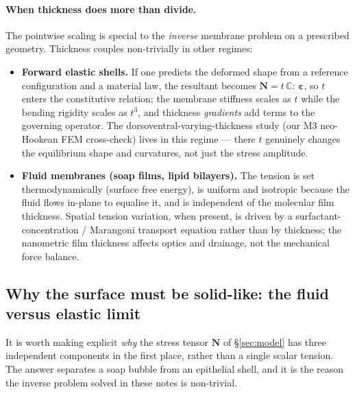 \documentclass[11pt]{article}
\newcommand{\Nb}{\mathbf{N}}           %
\begin{document}
\paragraph{When thickness does more than divide.}
The pointwise scaling is special to the \emph{inverse} membrane problem on a
prescribed geometry.  Thickness couples non-trivially in other regimes:
\begin{itemize}[nosep]
  \item \textbf{Forward elastic shells.}  If one predicts the deformed shape
        from a reference configuration and a material law, the resultant becomes
        $\Nb = t\,\mathbb{C}{:}\,\bm{\varepsilon}$, so $t$ enters the
        constitutive relation; the membrane stiffness scales as $t$ while the
        bending rigidity scales as $t^3$, and thickness \emph{gradients} add
        terms to the governing operator.  The dorsoventral-varying-thickness
        study (our M3 neo-Hookean FEM cross-check) lives in this regime — there
        $t$ genuinely changes the equilibrium shape and curvatures, not just the
        stress amplitude.
  \item \textbf{Fluid membranes (soap films, lipid bilayers).}  The tension is
        set thermodynamically (surface free energy), is uniform and isotropic
        because the fluid flows in-plane to equalise it, and is independent of
        the molecular film thickness.  Spatial tension variation, when present,
        is driven by a surfactant-concentration / Marangoni transport equation
        rather than by thickness; the nanometric film thickness affects optics
        and drainage, not the mechanical force balance.
\end{itemize}

\subsection{Why the surface must be solid-like: the fluid versus elastic limit}
\label{sec:fluid-vs-elastic}

It is worth making explicit \emph{why} the stress tensor $\Nb$ of
\S\ref{sec:model} has three independent components in the first place, rather
than a single scalar tension.  The answer separates a soap bubble from an
epithelial shell, and it is the reason the inverse problem solved in these notes
is non-trivial.
\end{document}
